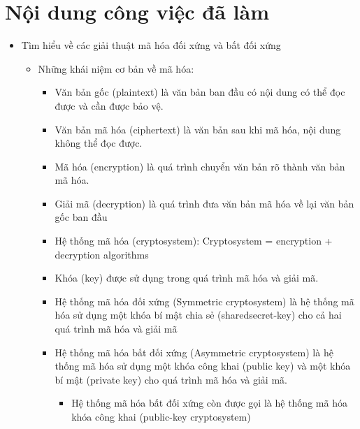 \documentclass[a4paper]{article}
\begin{document}
\section{Nội dung công việc đã làm}
\begin{itemize}
	\item
	Tìm hiểu về các giải thuật mã hóa đối xứng và bất đối xứng
	\begin{itemize}
		\item
		Những khái niệm cơ bản về mã hóa:
		\begin{itemize}
			\item
			Văn bản gốc (plaintext) là văn bản ban đầu có nội dung có thể đọc được và cần được bảo vệ.							
			\item
			Văn bản mã hóa (ciphertext) là văn bản sau khi mã hóa, nội dung không thể đọc được.
			\item
			Mã hóa (encryption) là quá trình chuyển văn bản rõ thành văn bản mã hóa.
			\item
			 Giải mã (decryption) là quá trình đưa văn bản mã hóa về lại văn bản gốc ban đầu
			\item
			Hệ thống mã hóa (cryptosystem):   Cryptosystem = encryption + decryption algorithms
			\item
			Khóa (key) được sử dụng trong quá trình mã hóa và giải mã.
   			\item
   			Hệ thống mã hóa đối xứng (Symmetric cryptosystem) là hệ thống mã hóa sử dụng một khóa bí mật chia sẻ (sharedsecret-key) cho cả hai quá trình mã hóa và giải mã
   			\item
   			Hệ thống mã hóa bất đối xứng (Asymmetric cryptosystem) là hệ thống mã hóa sử dụng một khóa công khai (public key) và một khóa bí mật (private key) cho quá trình mã hóa và giải mã.
   			\begin{itemize}
   				\item
   				Hệ thống mã hóa bất đối xứng còn được gọi là hệ thống mã hóa khóa công khai (public-key cryptosystem)\\
   			\end{itemize}
   			

\end{itemize}
\end{itemize}
\end{itemize}
\end{document}
